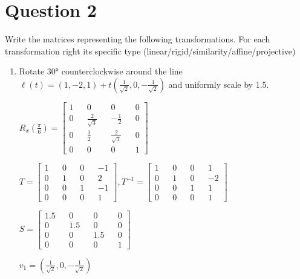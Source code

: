 \documentclass{article}
\begin{document}
    \newpage

    \section*{Question 2}

    Write the matrices representing the following transformations. For each transformation right its specific type (linear/rigid/similarity/affine/projective)

    \begin{enumerate}
        \item Rotate 30° counterclockwise around the line $\ell(t) = (1, -2, 1) + t (\frac{1}{\sqrt{2}}, 0, - \frac{1}{\sqrt{2}})$ and uniformly scale by 1.5.
        
        $R_{x}(\frac{\pi}{6}) = \begin{bmatrix}
            1 && 0 && 0 && 0 \\ 
            0 && \frac{2}{\sqrt{3}} && - \frac{1}{2} && 0 \\ 
            0 && \frac{1}{2}  && \frac{2}{\sqrt{3}} && 0 \\ 
            0 && 0 && 0 && 1 
        \end{bmatrix}$

        $T = \begin{bmatrix}
            1 && 0 && 0 && -1 \\ 
            0 && 1 && 0 && 2 \\ 
            0 && 0 && 1 && -1 \\ 
            0 && 0 && 0 && 1 
        \end{bmatrix}, T^{-1} = \begin{bmatrix}
            1 && 0 && 0 && 1 \\ 
            0 && 1 && 0 && -2 \\ 
            0 && 0 && 1 && 1 \\ 
            0 && 0 && 0 && 1 
        \end{bmatrix}$


        $S = \begin{bmatrix}
            1.5 && 0 && 0 && 0 \\ 
            0 && 1.5 && 0 && 0 \\ 
            0 && 0 && 1.5 && 0 \\ 
            0 && 0 && 0 && 1 
        \end{bmatrix}$

        $v_1 = (\frac{1}{\sqrt{2}}, 0, - \frac{1}{\sqrt{2}})$
       

\end{enumerate}
\end{document}
